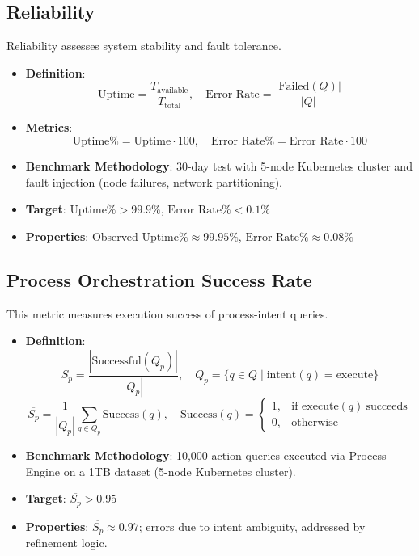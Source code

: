 \documentclass[11pt]{article}
\begin{document}
\subsection{Reliability}
\label{subsec:reliability}

Reliability assesses system stability and fault tolerance.

\begin{itemize}
    \item \textbf{Definition}:
        \[
        \text{Uptime} = \frac{T_{\text{available}}}{T_{\text{total}}}, \quad
        \text{Error Rate} = \frac{|\text{Failed}(Q)|}{|Q|}
        \]

    \item \textbf{Metrics}:
        \[
        \text{Uptime\%} = \text{Uptime} \cdot 100, \quad
        \text{Error Rate\%} = \text{Error Rate} \cdot 100
        \]

    \item \textbf{Benchmark Methodology}: 30-day test with 5-node Kubernetes cluster and fault injection (node failures, network partitioning).

    \item \textbf{Target}: $\text{Uptime\%} > 99.9\%$, $\text{Error Rate\%} < 0.1\%$

    \item \textbf{Properties}: Observed $\text{Uptime\%} \approx 99.95\%$, $\text{Error Rate\%} \approx 0.08\%$
\end{itemize}

\subsection{Process Orchestration Success Rate}
\label{subsec:orchestration_success}

This metric measures execution success of process-intent queries.

\begin{itemize}
    \item \textbf{Definition}:
        \[
        S_p = \frac{|\text{Successful}(Q_p)|}{|Q_p|}, \quad
        Q_p = \{ q \in Q \mid \text{intent}(q) = \text{execute} \}
        \]
        \[
        \overline{S_p} = \frac{1}{|Q_p|} \sum_{q \in Q_p} \text{Success}(q), \quad
        \text{Success}(q) =
        \begin{cases}
        1, & \text{if execute}(q)\ \text{succeeds} \\
        0, & \text{otherwise}
        \end{cases}
        \]

    \item \textbf{Benchmark Methodology}: 10,000 action queries executed via Process Engine on a 1TB dataset (5-node Kubernetes cluster).

    \item \textbf{Target}: $\overline{S_p} > 0.95$

    \item \textbf{Properties}: $\overline{S_p} \approx 0.97$; errors due to intent ambiguity, addressed by refinement logic.
\end{itemize}
\end{document}
